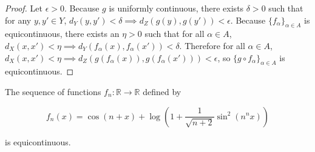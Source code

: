 \begin{proof}

Let \(\epsilon > 0\). Because \(g\) is uniformly continuous, there exists \(\delta > 0\) such that for any \(y, y' \in Y\), \(d_Y(y, y') < \delta \implies d_Z(g(y), g(y')) < \epsilon\). Because \(\{f_\alpha\}_{\alpha \in A}\) is equicontinuous, there exists an \(\eta > 0\) such that for all \(\alpha \in A\), \(d_X(x, x') < \eta \implies d_Y( f_\alpha(x), f_\alpha(x')) < \delta\). Therefore for all \(\alpha \in A\), \(d_X(x, x') < \eta \implies d_Z(g(f_\alpha(x)), g(f_\alpha(x'))) < \epsilon\), so \(\{g \circ f_\alpha\}_{\alpha \in A}\) is equicontinuous.

\end{proof}

\begin{proposition}\label{ra.425b.hw5.5}

The sequence of functions \(f_n: \mathbb{R} \to \mathbb{R}\) defined by

\[
f_n(x) = \cos(n +x) + \log \left( 1 + \frac{1}{\sqrt{n+2}} \sin^2(n^nx) \right)
\]

is equicontinuous.

\end{proposition}

